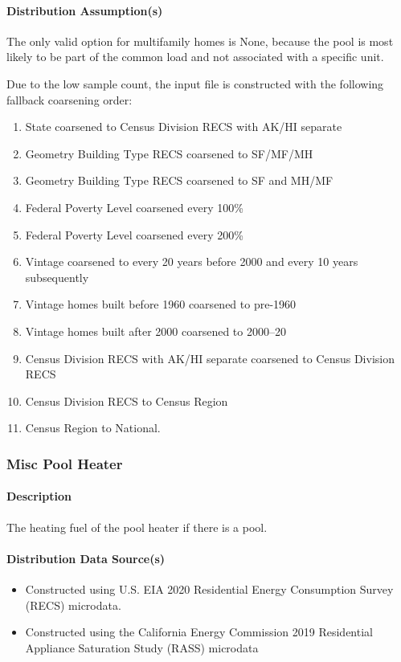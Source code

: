 \paragraph{Distribution Assumption(s)}
The only valid option for multifamily homes is None, because the pool is most likely to be part of the common load and not associated with a specific unit. 

Due to the low sample count, the input file is constructed with the following fallback coarsening order: 
\begin{enumerate}
    \item State coarsened to Census Division RECS with AK/HI separate 
    \item  Geometry Building Type RECS coarsened to SF/MF/MH 
    \item  Geometry Building Type RECS coarsened to SF and MH/MF 
    \item  Federal Poverty Level coarsened every 100\% 
    \item Federal Poverty Level coarsened every 200\% 
    \item Vintage coarsened to every 20 years before 2000 and every 10 years subsequently 
    \item  Vintage homes built before 1960 coarsened to pre-1960 
    \item Vintage homes built after 2000 coarsened to 2000--20 
    \item Census Division RECS with AK/HI separate coarsened to Census Division RECS 
    \item Census Division RECS to Census Region 
    \item Census Region to National.
\end{enumerate}

\subsubsection{Misc Pool Heater}
\paragraph{Description}
The heating fuel of the pool heater if there is a pool.

\paragraph{Distribution Data Source(s)}
\begin{itemize}
    \item Constructed using U.S. EIA 2020 Residential Energy Consumption Survey (RECS) microdata.
    \item Constructed using the California Energy Commission 2019 Residential Appliance Saturation Study (RASS) microdata 
\end{itemize} 

